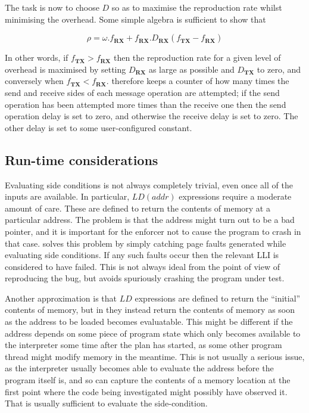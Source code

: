 The task is now to choose $D$ so as to maximise the reproduction
rate whilst minimising the overhead.  Some simple algebra is
sufficient to show that

\begin{displaymath}
\rho = {\omega}.f_{\mathbf{RX}} + f_{\mathbf{RX}}.D_{\mathbf{RX}}(f_{\mathbf{TX}} - f_{\mathbf{RX}})
\end{displaymath}

In other words, if $f_{\mathbf{TX}} > f_{\mathbf{RX}}$ then the
reproduction rate for a given level of overhead is maximised by
setting $D_{\mathbf{RX}}$ as large as possible and $D_{\mathbf{TX}}$
to zero, and conversely when $f_{\mathbf{TX}} < f_{\mathbf{RX}}$.
{\Implementation} therefore keeps a counter of how many times the send
and receive sides of each message operation are attempted; if the send
operation has been attempted more times than the receive one then the
send operation delay is set to zero, and otherwise the receive delay
is set to zero.  The other delay is set to some user-configured
constant.

\subsection{Run-time considerations}

Evaluating side conditions is not always completely trivial, even once
all of the inputs are available.  In particular, $LD(addr)$
expressions require a moderate amount of care.  These are defined to
return the contents of memory at a particular address.  The problem is
that the address might turn out to be a bad pointer, and it is
important for the enforcer not to cause the program to crash in that
case.  {\Implementation} solves this problem by simply catching page
faults generated while evaluating side conditions.  If any such faults
occur then the relevant LLI is considered to have failed.  This is not
always ideal from the point of view of reproducing the bug, but avoids
spuriously crashing the program under test.


Another approximation is that $LD$ expressions are defined to return
the ``initial'' contents of memory, but in {\implementation} they
instead return the contents of memory as soon as the address to be
loaded becomes evaluatable.  This might be different if the address
depends on some piece of program state which only becomes available to
the interpreter some time after the plan has started, as some other
program thread might modify memory in the meantime.  This is not
usually a serious issue, as the interpreter usually becomes able to
evaluate the address before the program itself is, and so can capture
the contents of a memory location at the first point where the code
being investigated might possibly have observed it.  That is usually
sufficient to evaluate the side-condition.

